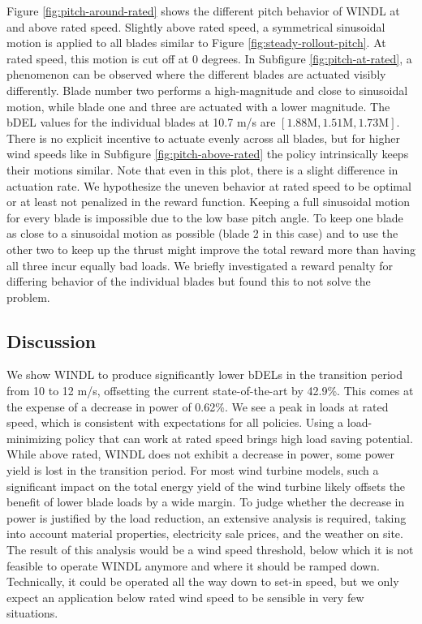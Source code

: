 Figure \ref{fig:pitch-around-rated} shows the different pitch behavior of \ac{WINDL} at and above rated speed. Slightly above rated speed, a symmetrical sinusoidal motion is applied to all blades similar to Figure \ref{fig:steady-rollout-pitch}. At rated speed, this motion is cut off at 0 degrees. In Subfigure \ref{fig:pitch-at-rated}, a phenomenon can be observed where the different blades are actuated visibly differently. Blade number two performs a high-magnitude and close to sinusoidal motion, while blade one and three are actuated with a lower magnitude. The bDEL values for the individual blades at 10.7 m/s are $[1.88\text{M}, 1.51\text{M}, 1.73\text{M}]$. There is no explicit incentive to actuate evenly across all blades, but for higher wind speeds like in Subfigure \ref{fig:pitch-above-rated} the policy intrinsically keeps their motions similar. Note that even in this plot, there is a slight difference in actuation rate. We hypothesize the uneven behavior at rated speed to be optimal or at least not penalized in the reward function. Keeping a full sinusoidal motion for every blade is impossible due to the low base pitch angle. To keep one blade as close to a sinusoidal motion as possible (blade 2 in this case) and to use the other two to keep up the thrust might improve the total reward more than having all three incur equally bad loads. We briefly investigated a reward penalty for differing behavior of the individual blades but found this to not solve the problem.

\subsection{Discussion}

We show WINDL to produce significantly lower bDELs in the transition period from 10 to 12 m/s, offsetting the current state-of-the-art by 42.9\%. This comes at the expense of a decrease in power of 0.62\%. We see a peak in loads at rated speed, which is consistent with expectations for all policies. Using a load-minimizing policy that can work at rated speed brings high load saving potential. While above rated, WINDL does not exhibit a decrease in power, some power yield is lost in the transition period. For most wind turbine models, such a significant impact on the total energy yield of the wind turbine likely offsets the benefit of lower blade loads by a wide margin. To judge whether the decrease in power is justified by the load reduction, an extensive analysis is required, taking into account material properties, electricity sale prices, and the weather on site. The result of this analysis would be a wind speed threshold, below which it is not feasible to operate WINDL anymore and where it should be ramped down. Technically, it could be operated all the way down to set-in speed, but we only expect an application below rated wind speed to be sensible in very few situations.


